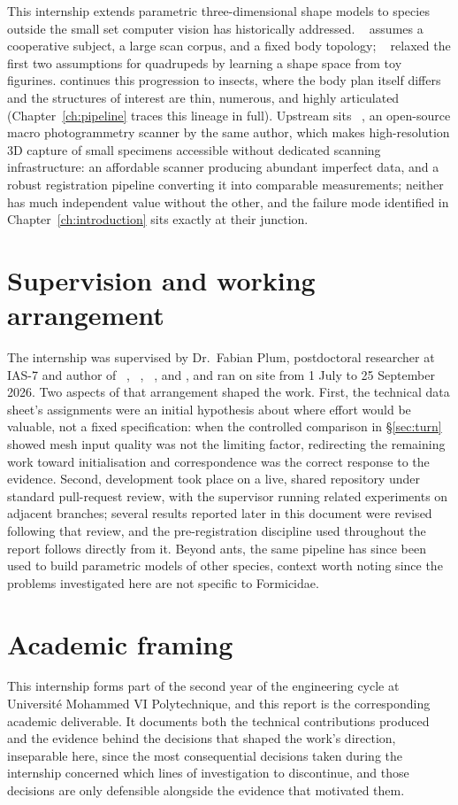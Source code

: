 This internship extends parametric three-dimensional shape models to species
outside the small set computer vision has historically addressed.
~\cite{smpl} assumes a cooperative subject, a large scan corpus,
and a fixed body topology; ~\cite{smal} relaxed the first two
assumptions for quadrupeds by learning a shape space from toy figurines.
 continues this progression to insects, where the body plan
itself differs and the structures of interest are thin, numerous, and
highly articulated (Chapter~\ref{ch:pipeline} traces this lineage in full).
Upstream sits ~\cite{scant}, an open-source macro photogrammetry
scanner by the same author, which makes high-resolution 3D capture of small
specimens accessible without dedicated scanning infrastructure: an
affordable scanner producing abundant imperfect data, and a robust
registration pipeline converting it into comparable measurements; neither
has much independent value without the other, and the failure mode
identified in Chapter~\ref{ch:introduction} sits exactly at their junction.

\section{Supervision and working arrangement}

The internship was supervised by Dr.\ Fabian Plum, postdoctoral researcher
at IAS-7 and author of ~\cite{scant}, ~\cite{replicant},
~\cite{omnitrax}, and , and ran on site from 1
July to 25 September 2026. Two aspects of that arrangement shaped the work.
First, the technical data sheet's assignments were an initial hypothesis
about where effort would be valuable, not a fixed specification: when the
controlled comparison in \S\ref{sec:turn} showed mesh input quality was not
the limiting factor, redirecting the remaining work toward initialisation
and correspondence was the correct response to the evidence. Second,
development took place on a live, shared repository under standard
pull-request review, with the supervisor running related experiments on
adjacent branches; several results reported later in this document were
revised following that review, and the pre-registration discipline used
throughout the report follows directly from it. Beyond ants, the same
pipeline has since been used to build parametric models of other species,
context worth noting since the problems investigated here are not specific
to Formicidae.

\section{Academic framing}

This internship forms part of the second year of the engineering cycle at
Universit\'e Mohammed VI Polytechnique, and this report is the corresponding
academic deliverable. It documents both the technical contributions produced
and the evidence behind the decisions that shaped the work's direction,
inseparable here, since the most consequential decisions taken during the
internship concerned which lines of investigation to discontinue, and those
decisions are only defensible alongside the evidence that motivated them.
